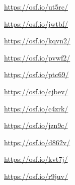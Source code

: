 \begin{multicols}{2}
\begin{description}[font=\normalfont]
\item[\autoref{fig:hombrePRESEEAfaena}:] \url{https://osf.io/ut5rc/}
\item[\autoref{fig:hombrePRESEEAinviernos}:] \url{https://osf.io/jwtbf/}
\item[\autoref{fig:andaPRESEEAidolo}:] \url{https://osf.io/kqvn2/}
\item[\autoref{fig:andaPRESEEAbruselas}:] \url{https://osf.io/pvwf2/}
\item[\autoref{fig:andaPRESEEAquinientos}:] \url{https://osf.io/ptc69/}
\item[\autoref{fig:andaPRESEEAgracias}:] \url{https://osf.io/cjbev/}
\item[\autoref{fig:andaPRESEEAtalcual}:] \url{https://osf.io/c4zrk/}
\item[\autoref{fig:vayaPRESEEAfallo}:] \url{https://osf.io/jzn9c/}
\item[\autoref{fig:vayaPRESEEAstauffer}:] \url{https://osf.io/d862v/}
\item[\autoref{fig:vayaPRESEEAproblemas}:] \url{https://osf.io/kvt7j/}
\item[\autoref{fig:vayaPRESEEAsuspendia}:] \url{https://osf.io/r9juv/}
\end{description}
\end{multicols}

